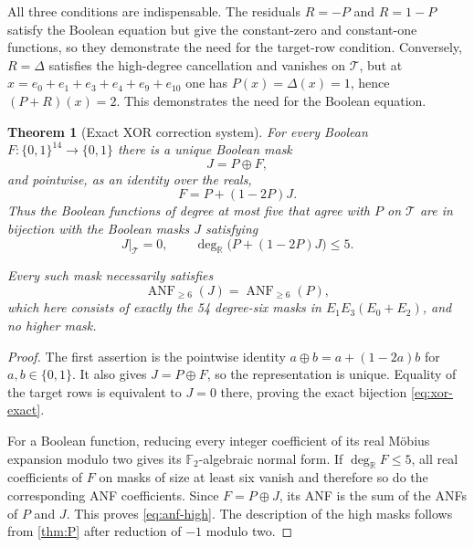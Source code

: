 \documentclass[11pt]{article}
\newtheorem{theorem}{Theorem}[section]
\theoremstyle{definition}
\newcommand{\cube}[1]{\{0,1\}^{#1}}
\newcommand{\Ftwo}{\mathbb F_2}
\newcommand{\ANF}{\operatorname{ANF}}
\begin{document}
All three conditions are indispensable.  The residuals \(R=-P\) and
\(R=1-P\) satisfy the Boolean equation but give the constant-zero and
constant-one functions, so they demonstrate the need for the target-row
condition.  Conversely, \(R=\Delta\) satisfies the high-degree cancellation
and vanishes on \(\mathcal T\), but at
\(x=e_0+e_1+e_3+e_4+e_9+e_{10}\) one has
\(P(x)=\Delta(x)=1\), hence \((P+R)(x)=2\).  This demonstrates the need for
the Boolean equation.

\begin{theorem}[Exact XOR correction system]\label{thm:xor}
For every Boolean \(F:\cube{14}\to\{0,1\}\) there is a unique Boolean mask
\[
 J=P\oplus F,
\]
and pointwise, as an identity over the reals,
\begin{equation}
 F=P+(1-2P)J.                                             \label{eq:xor-real}
\end{equation}
Thus the Boolean functions of degree at most five that agree with \(P\) on
\(\mathcal T\) are in bijection with the Boolean masks \(J\) satisfying
\begin{equation}
 J|_{\mathcal T}=0,\qquad
 \deg_{\mathbb R}\bigl(P+(1-2P)J\bigr)\le5.              \label{eq:xor-exact}
\end{equation}

Every such mask necessarily satisfies
\begin{equation}
 \ANF_{\ge6}(J)=\ANF_{\ge6}(P),                           \label{eq:anf-high}
\end{equation}
which here consists of exactly the 54 degree-six masks in
\(E_1E_3(E_0+E_2)\), and no higher mask.
\end{theorem}

\begin{proof}
The first assertion is the pointwise identity
\(a\oplus b=a+(1-2a)b\) for \(a,b\in\{0,1\}\).  It also gives
\(J=P\oplus F\), so the representation is unique.  Equality of the target
rows is equivalent to \(J=0\) there, proving the exact bijection
\cref{eq:xor-exact}.

For a Boolean function, reducing every integer coefficient of its real
M\"obius expansion modulo two gives its \(\Ftwo\)-algebraic normal form.  If
\(\deg_{\mathbb R}F\le5\), all real coefficients of \(F\) on masks of size at
least six vanish and therefore so do the corresponding ANF coefficients.
Since \(F=P\oplus J\), its ANF is the sum of the ANFs of \(P\) and \(J\).
This proves \cref{eq:anf-high}.  The description of the high masks follows
from \cref{thm:P} after reduction of \(-1\) modulo two.
\end{proof}
\end{document}

